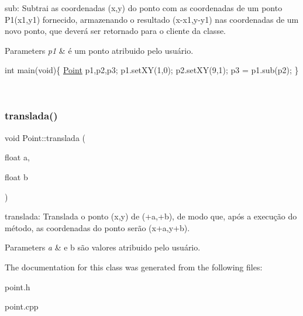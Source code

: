sub\+: Subtrai as coordenadas (x,y) do ponto com as coordenadas de um ponto P1(x1,y1) fornecido, armazenando o resultado (x-\/x1,y-\/y1) nas coordenadas de um novo ponto, que deverá ser retornado para o cliente da classe. 


\begin{DoxyParams}{Parameters}
{\em p1} & é um ponto atribuido pelo usuário. 
\begin{DoxyPre}
int main(void)\{
   \mbox{\hyperlink{class_point}{Point}} p1,p2,p3;
   p1.setXY(1,0);
   p2.setXY(9,1);
   p3 = p1.sub(p2);
\}
\end{DoxyPre}
 \\
\hline
\end{DoxyParams}
\mbox{\label{class_point_ad9676e36f3444534b609e3c68422239a}} 
\subsubsection{\texorpdfstring{translada()}{translada()}}
{\footnotesize\ttfamily void Point\+::translada (\begin{DoxyParamCaption}\item[{float}]{a,  }\item[{float}]{b }\end{DoxyParamCaption})}



translada\+: Translada o ponto (x,y) de (+a,+b), de modo que, após a execução do método, as coordenadas do ponto serão (x+a,y+b). 


\begin{DoxyParams}{Parameters}
{\em a} & e b são valores atribuido pelo usuário. \\
\hline
\end{DoxyParams}


The documentation for this class was generated from the following files\+:\begin{DoxyCompactItemize}
\item 
point.\+h\item 
point.\+cpp\end{DoxyCompactItemize}
